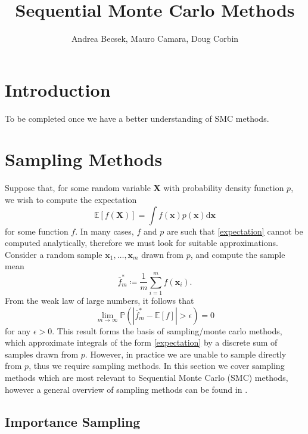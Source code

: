 \documentclass[12pt,a4paper]{article}
\title{Sequential Monte Carlo Methods}
\author{Andrea Becsek, Mauro Camara, Doug Corbin}
\newcommand{\x}{\boldsymbol{x}}
\newcommand{\X}{\boldsymbol{X}}
\begin{document}
\maketitle
\tableofcontents

\section{Introduction}

To be completed once we have a better understanding of SMC methods.

\section{Sampling Methods}

Suppose that, for some random variable $\X$ with probability density function $p$, we wish to compute the expectation
\begin{equation}
\label{expectation}
\mathbb{E}[f(\X)] = \int f(\x) p(\x) \text{d}\x
\end{equation}
for some function $f$. In many cases, $f$ and $p$ are such that \eqref{expectation} cannot be computed analytically, therefore we must look for suitable approximations. Consider a random sample $\x_1, \ldots, \x_m$ drawn from $p$, and compute the sample mean
\begin{equation}
\label{sample mean}
\bar{f}^*_m \coloneqq \frac{1}{m} \sum_{i = 1}^m f(\x_i) \text{.}
\end{equation}
From the weak law of large numbers, it follows that
\begin{equation}
\lim_{m \rightarrow \infty} \mathbb{P}(|\bar{f}^*_m - \mathbb{E}[f]| > \epsilon) = 0
\end{equation}
for any $\epsilon > 0 $. This result forms the basis of sampling/monte carlo methods, which approximate integrals of the form \eqref{expectation} by a discrete sum of samples drawn from $p$. However, in practice we are unable to sample directly from $p$, thus we require sampling methods. In this section we cover sampling methods which are most relevant to Sequential Monte Carlo (SMC) methods, however a general overview of sampling methods can be found in \cite[Chapter 11]{bishop:prml}.

\subsection{Importance Sampling}
\end{document}
